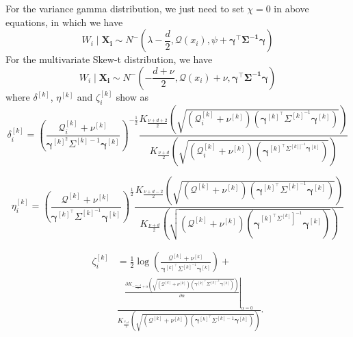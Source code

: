For the variance gamma distribution, we just need to set $\chi = 0$ in above equations, in which we have 
\begin{equation}
    W_i \mid \mathbf{X_i} \sim N^- (\lambda - \frac{d}{2}, \mathcal{Q}(x_i), \psi + \mathbf{\gamma^{\top} \Sigma^{-1} \gamma})
\end{equation}
For the multivariate Skew-t distribution, we have 
\begin{equation}
    W_i \mid \mathbf{X_i} \sim N^- (-\frac{d + \nu}{2}, \mathcal{Q}(x_i) + \nu, \mathbf{\gamma^{\top} \Sigma^{-1} \gamma})
\end{equation}
where $\delta^{[k]}$, $\eta^{[k]}$ and $\zeta_i^{[k]}$ show as 
\begin{equation}
    \delta_i^{[k]}=\left(\frac{\mathcal{Q}^{[k]}_i+\nu^{[k]}}{\mathbf{\gamma}^{[k]^2} \Sigma^{[k]-1} \mathbf{\gamma}^{[k]}}\right)^{-\frac{1}{2}} \frac{K_{\frac{\nu+d+2}{2}}\left(\sqrt{\left(\mathcal{Q}^{[k]}_i+\nu^{[k]}\right)\left(\mathbf{\gamma}^{[k]^{\top}} \Sigma^{[k]^{-1}} \mathbf{\gamma}^{[k]}\right)}\right)}{K_{\frac{\nu+d}{2}}\left(\sqrt{\left(\mathcal{Q}^{[k]}_i+\nu^{[k]}\right)\left(\mathbf{\gamma}^{[k]^{\top} \Sigma^{[k]]^{-1}} \mathbf{\gamma}^{[k]}}\right)}\right)}
\end{equation}

\begin{equation}
    \eta_i^{[k]}=\left(\frac{\mathcal{Q}^{[k]}+\nu^{[k]}}{\mathbf{\gamma}^{[k]^{\top}} \Sigma^{[k]^{-1}} \mathbf{\gamma}^{[k]}}\right)^{\frac{1}{2}} \frac{K_{\frac{\nu+d-2}{2}}\left(\sqrt{\left(\mathcal{Q}^{[k]}+\nu^{[k]}\right)\left(\mathbf{\gamma}^{[k]^{\top}} \Sigma^{[k]^{-1}} \mathbf{\gamma}^{[k]}\right)}\right)}{K_{\frac{\nu+d}{2}}\left(\sqrt{\left(\mathcal{Q}^{[k]}+\nu^{[k]}\right)\left(\mathbf{\gamma}^{\left.[k]^{\top} \Sigma^{[k]}\right]^{-1}} \mathbf{\gamma}^{[k]}\right)}\right)}
\end{equation}

\begin{equation}
    \begin{aligned}
\zeta_i^{[k]} & =\frac{1}{2} \log \left(\frac{\mathcal{Q}^{[k]}+\nu^{[k]}}{\mathbf{\gamma}^{[k]^{\top}} \Sigma^{[k]^{-1}} \mathbf{\gamma}^{[k]}}\right)+ \\
& \frac{\left.\frac{\partial K_{-\frac{\nu+d}{2}+\alpha}\left(\sqrt{\left(\mathcal{Q}^{[k]}+\nu^{[k]}\right)\left(\mathbf{\gamma}^{[k]^{\top}} \Sigma^{[k]^{-1}} \mathbf{\gamma}^{[k]}\right)}\right)}{\partial \alpha}\right|_{\alpha=0}}{K_{\frac{v_{+d}}{2}}\left(\sqrt{\left(\mathcal{Q}^{[k]}+\nu^{[k]}\right)\left(\mathbf{\gamma}^{[k]^{\top}} \Sigma^{[k]-1} \mathbf{\gamma}^{[k]}\right)}\right)} .
\end{aligned}
\end{equation}

